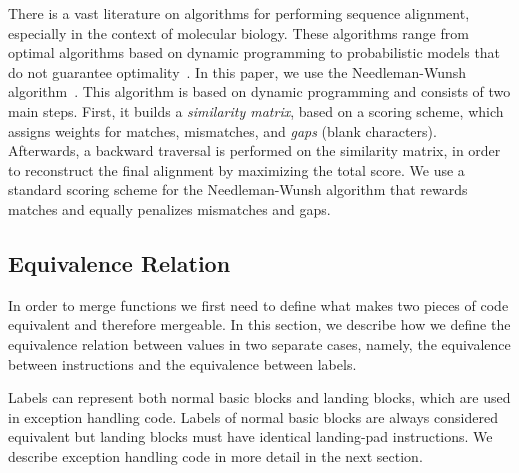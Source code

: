 There is a vast literature on algorithms for performing sequence alignment,
especially in the context of molecular biology.
These algorithms range from optimal algorithms based on dynamic programming to
probabilistic models that do not guarantee
optimality~\cite{needleman70,smith81,carrillo88,hickey11}.
In this paper, we use the Needleman-Wunsh algorithm~\cite{needleman70}.
This algorithm is based on dynamic programming and consists of two main steps.
First, it builds a \textit{similarity matrix}, based on a scoring scheme, which
assigns weights for matches, mismatches, and \textit{gaps} (blank characters).
Afterwards, a backward traversal is performed on the similarity matrix, in order
to reconstruct the final alignment by maximizing the total score.
We use a standard scoring scheme for the Needleman-Wunsh algorithm that rewards
matches and equally penalizes mismatches and gaps.


\vspace{-2ex}
\subsection{Equivalence Relation}

In order to merge functions we first need to define what makes two pieces of
code equivalent and therefore mergeable.
In this section, we describe how we define the equivalence relation between values in two
separate cases, namely, the equivalence between instructions and the
equivalence between labels.

Labels can represent both normal basic blocks and landing blocks, which are used
in exception handling code.
Labels of normal basic blocks are always considered equivalent but
landing blocks must have identical landing-pad instructions.
We describe exception handling code in more detail in the next section.

